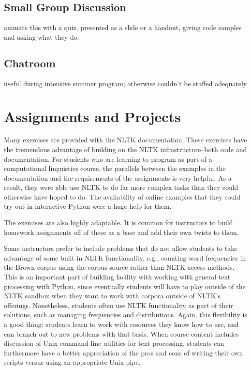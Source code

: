 \documentclass[11pt]{article}
\begin{document}
\subsection{Small Group Discussion}

animate this with a quiz, presented as a slide or a handout, giving code samples and asking what they do.

\subsection{Chatroom}

useful during intensive summer program; otherwise couldn't be staffed adequately

\section{Assignments and Projects}
\label{sec:projects}

Many exercises are provided with the NLTK documentation. These
exercises have the tremendous advantage of building on the NLTK
infrastructure--both code and documentation. For students who are
learning to program as part of a computational linguistics course, the
parallels between the examples in the documentation and the
requirements of the assignments is very helpful. As a result, they
were able use NLTK to do far more complex tasks than they could
otherwise have hoped to do. The availability of online examples that
they could try out in interactive Python were a huge help for
them. 

The exercises are also highly adaptable. It is common for instructors
to build homework assignments off of these as a base and add their own
twists to them. 

Some instructors prefer to include problems that do not allow students
to take advantage of some built in NLTK functionality, e.g., counting
word frequencies in the Brown corpus using the corpus source rather
than NLTK access methods.  This is an important part of building
facility with working with general text processing with Python, since
eventually students will have to play outside of the NLTK sandbox when
they want to work with corpora outside of NLTK's
offerings. Nonetheless, students often use NLTK functionality as part
of their solutions, such as managing frequencies and
distributions. Again, this flexibility is a good thing: students learn
to work with resources they know how to use, and can branch out to new
problems with that basis. When course content includes discussion of
Unix command line utilities for text processing, students can
furthermore have a better appreciation of the pros and cons of writing
their own scripts versus using an appropriate Unix pipe.
\end{document}

